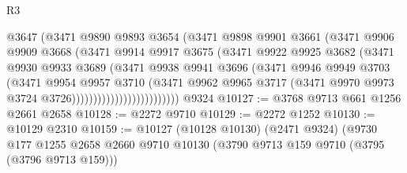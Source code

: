 \begin{lexlean}{R3}
\begin{coremodule}
                                @3647
                                (@3471
                                  @9890
                                  @9893
                                  @3654
                                  (@3471
                                    @9898
                                    @9901
                                    @3661
                                    (@3471
                                      @9906
                                      @9909
                                      @3668
                                      (@3471
                                        @9914
                                        @9917
                                        @3675
                                        (@3471
                                          @9922
                                          @9925
                                          @3682
                                          (@3471
                                            @9930
                                            @9933
                                            @3689
                                            (@3471
                                              @9938
                                              @9941
                                              @3696
                                              (@3471
                                                @9946
                                                @9949
                                                @3703
                                                (@3471
                                                  @9954
                                                  @9957
                                                  @3710
                                                  (@3471
                                                    @9962
                                                    @9965
                                                    @3717
                                                    (@3471
                                                      @9970
                                                      @9973
                                                      @3724
                                                      @3726)))))))))))))))))))))))))
    @9324
@10127 := @3768 @9713 @661 @1256 @2661 @2658
@10128 := @2272 @9710
@10129 := @2272 @1252
@10130 := @10129 @2310
@10159 := @10127
    (@10128 @10130)
    (@2471 @9324)
    (@9730
      @177
      @1255
      @2658
      @2660
      @9710
      @10130
      (@3790 @9713 @159 @9710 (@3795 (@3796 @9713 @159)))

\end{coremodule}
\end{lexlean}
